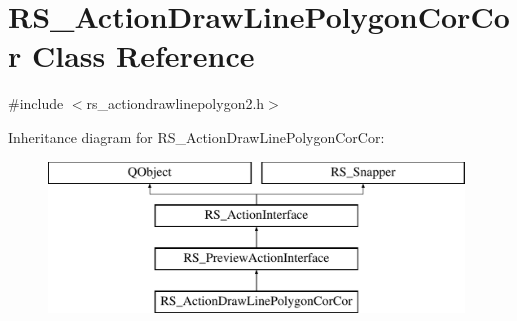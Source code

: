 \hypertarget{classRS__ActionDrawLinePolygonCorCor}{\section{R\-S\-\_\-\-Action\-Draw\-Line\-Polygon\-Cor\-Cor Class Reference}
\label{classRS__ActionDrawLinePolygonCorCor}
}


{\ttfamily \#include $<$rs\-\_\-actiondrawlinepolygon2.\-h$>$}

Inheritance diagram for R\-S\-\_\-\-Action\-Draw\-Line\-Polygon\-Cor\-Cor\-:\begin{figure}[H]
\begin{center}
\leavevmode
\includegraphics[height=4.000000cm]{classRS__ActionDrawLinePolygonCorCor}
\end{center}
\end{figure}
